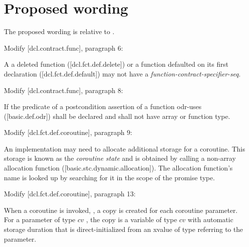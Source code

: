 \section{Proposed wording}
\label{wording}

The proposed wording is relative to \cite{P2900R8}.

Modify [dcl.contract.func], paragraph 6:
\begin{adjustwidth}{0.5cm}{0.5cm}
A a deleted function ([dcl.fct.def.delete])\removed{,} or a function defaulted on its first declaration ([dcl.fct.def.default]) may not have a \emph{function-contract-specifier-seq}.
\end{adjustwidth}

Modify [dcl.contract.func], paragraph 8:
\begin{adjustwidth}{0.5cm}{0.5cm}
If the predicate of a postcondition assertion of a function odr-uses ([basic.def.odr])  shall be declared  and shall not have array or function type.
\end{adjustwidth}

Modify [dcl.fct.def.coroutine], paragraph 9:
\begin{adjustwidth}{0.5cm}{0.5cm}
An implementation may need to allocate additional storage for a coroutine. This storage is known as the \emph{coroutine state} and is obtained by calling a non-array allocation function ([basic.stc.dynamic.allocation]). The allocation function's name is looked up by searching for it in the scope of the promise type.
\end{adjustwidth}

Modify [dcl.fct.def.coroutine], paragraph 13:
\begin{adjustwidth}{0.5cm}{0.5cm}
When a coroutine is invoked, , a copy is created for each coroutine parameter. For a parameter of type $cv$ , the copy is a variable of type $cv$  with automatic storage duration that is direct-initialized from an xvalue of type  referring to the parameter.
\end{adjustwidth}


